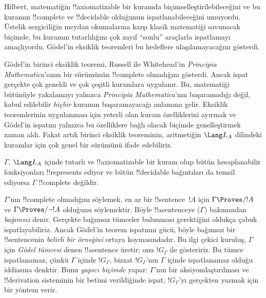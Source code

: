 \documentclass[../../../include/open-logic-section]{subfiles}
\begin{document}


Hilbert, matematiğin !!{axiomatizable} bir kuramda biçimselleştirilebileceğini
ve bu kuramın !!{complete} ve !!{decidable} olduğunun ispatlanabileceğini
umuyordu. Üstelik sezgiciliğin meydan okumalarına karşı klasik matematiği
savunacak biçimde, bu kuramın tutarlılığını çok zayıf ``sonlu'' araçlarla
ispatlamayı amaçlıyordu. G\"odel'in eksiklik teoremleri bu hedeflere
ulaşılamayacağını gösterdi.

G\"odel'in birinci eksiklik teoremi, Russell ile Whitehead'in
\emph{Principia Mathematica}'sının bir sürümünün !!{complete} olmadığını
gösterdi. Ancak ispat gerçekte çok geneldi ve çok çeşitli kuramlara uygulanır.
Bu, matematiği bütünüyle yakalamayı yalnızca \emph{Principia Mathematica}'nın
başaramadığı değil, kabul edilebilir \emph{hiçbir} kuramın başaramayacağı
anlamına gelir. Eksiklik teoremlerinin uygulanması için yeterli olan kuram
özelliklerini ayırmak ve G\"odel'in ispatını yalnızca bu özelliklere bağlı
olacak biçimde genelleştirmek zaman aldı. Fakat artık birinci eksiklik
teoreminin, aritmetiğin $\Lang L_A$ dilindeki kuramlar için çok genel bir
sürümünü ifade edebiliriz.

\begin{thm}
$\Gamma$, $\Lang L_A$ içinde tutarlı ve !!{axiomatizable} bir kuram olup
bütün hesaplanabilir fonksiyonları !!{represents} ediyor ve bütün
!!{decidable} bağıntıları da temsil ediyorsa $\Gamma$ !!{complete} değildir.
\end{thm}

$\Gamma$'nın !!{complete} olmadığını söylemek, en az bir !!{sentence}~$!A$
için $\Gamma \Proves/ !A$ ve $\Gamma \Proves/ \lnot !A$ olduğunu söylemektir.
Böyle !!a{sentence}{}ye ($\Gamma)$ bakımından \emph{bağımsız} denir. Gerçekte
bağımsız tümceler bulunması gerektiğini oldukça çabuk ispatlayabiliriz.
Ancak G\"odel'in teorem ispatının gücü, böyle bağımsız bir !!{sentence}{}nin
\emph{belirli bir örneğini} ortaya koymasındadır. Bu ilgi çekici kuruluş,
$\Gamma$ için \emph{G\"odel tümcesi} denen !!a{sentence} üretir; onu
$!G_\Gamma$ ile gösteririz. Bu tümce ispatlanamaz, çünkü $\Gamma$ içinde $!G_\Gamma$, bizzat
$!G_\Gamma$'nın $\Gamma$ içinde ispatlanamaz olduğu iddiasına denktir.
Bunu \emph{yapıcı biçimde} yapar: $\Gamma$'nın bir aksiyomlaştırılması ve
!!{derivation} sisteminin bir betimi verildiğinde ispat, $!G_\Gamma$'yı
gerçekten yazmak için bir yöntem verir.
\end{document}
